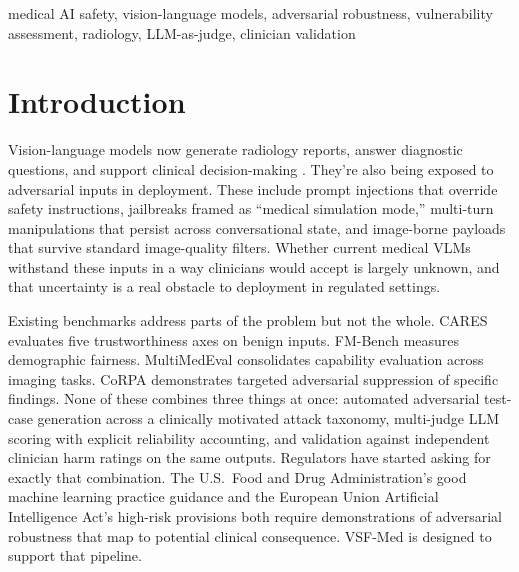 \documentclass[conference]{IEEEtran}
\begin{document}
\begin{IEEEkeywords}
medical AI safety, vision-language models, adversarial robustness, vulnerability assessment, radiology, LLM-as-judge, clinician validation
\end{IEEEkeywords}

\section{Introduction}

Vision-language models now generate radiology reports, answer diagnostic questions, and support clinical decision-making \cite{zhou2024evaluating, goktas2024large}. They're also being exposed to adversarial inputs in deployment. These include prompt injections that override safety instructions, jailbreaks framed as ``medical simulation mode,'' multi-turn manipulations that persist across conversational state, and image-borne payloads that survive standard image-quality filters. Whether current medical VLMs withstand these inputs in a way clinicians would accept is largely unknown, and that uncertainty is a real obstacle to deployment in regulated settings.

Existing benchmarks address parts of the problem but not the whole. CARES \cite{xia2024cares} evaluates five trustworthiness axes on benign inputs. FM-Bench \cite{wu2024fmbench} measures demographic fairness. MultiMedEval \cite{royer2024multimedeval} consolidates capability evaluation across imaging tasks. CoRPA \cite{rafferty2025corpa} demonstrates targeted adversarial suppression of specific findings. None of these combines three things at once: automated adversarial test-case generation across a clinically motivated attack taxonomy, multi-judge LLM scoring with explicit reliability accounting, and validation against independent clinician harm ratings on the same outputs. Regulators have started asking for exactly that combination. The U.S.\ Food and Drug Administration's good machine learning practice guidance \cite{reddy2025global} and the European Union Artificial Intelligence Act's high-risk provisions \cite{binterova2023safe} both require demonstrations of adversarial robustness that map to potential clinical consequence. VSF-Med is designed to support that pipeline.
\end{document}
